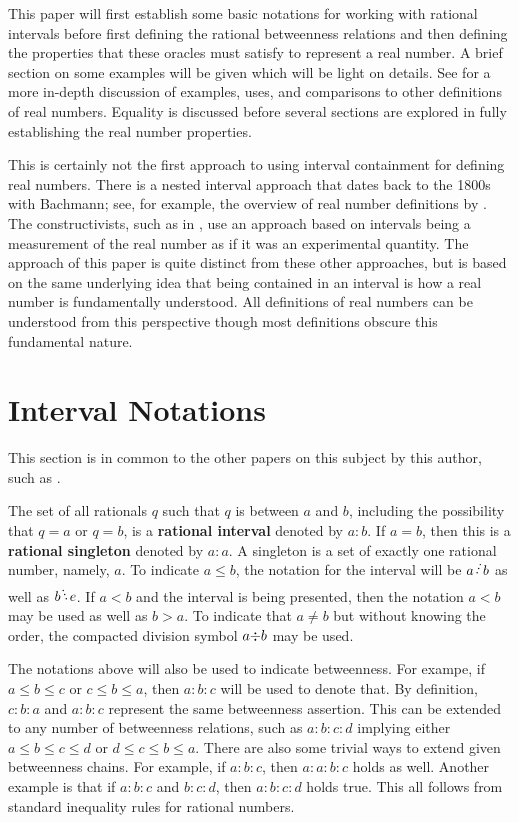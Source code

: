 \documentclass[12pt]{article}
\begin{document}
This paper will first establish some basic notations for working with rational intervals before first defining the rational betweenness relations and then defining the properties that these oracles must satisfy to represent a real number. A brief section on some examples will be given which will be light on details. See \cite{taylor23main} for a more in-depth discussion of examples, uses, and comparisons to other definitions of real numbers. Equality is discussed before several sections are explored in fully establishing the real number properties. 

This is certainly not the first approach to using interval containment for defining real numbers. There is a nested interval approach that dates back to the 1800s with Bachmann; see, for example, the overview of real number definitions by \cite{ittay-2015}. The constructivists, such as in \cite{bridger}, use an approach based on intervals being a measurement of the real number as if it was an experimental quantity. The approach of this paper is quite distinct from these other approaches, but is based on the same underlying idea that being contained in an interval is how a real number is fundamentally understood. All definitions of real numbers can be understood from this perspective though most definitions obscure this fundamental nature. 

\section{Interval Notations}

This section is in common to the other papers on this subject by this author, such as \cite{taylor24dedekind}.

The set of all rationals $q$ such that $q$ is between $a$ and $b$, including the possibility that $q=a$ or $q=b$, is a \textbf{rational interval} denoted by $a:b$. If $a=b$, then this is a \textbf{rational singleton} denoted by $a:a$. A singleton is a set of exactly one rational number, namely, $a$. To indicate $a \leq b$, the notation for the interval will be $a \lte b$ as well as $b \gte e$. If $a < b$ and the interval is being presented, then the notation $a \lt b$ may be used as well as $b \gt a$. To indicate that $a \neq b$ but without knowing the order, the compacted division symbol $a \mathord{\div} b$ may be used. 

The notations above will also be used to indicate betweenness. For exampe, if $a \leq b \leq c$ or $c \leq b \leq a$, then $a:b:c$ will be used to denote that. By definition, $c:b:a$ and $a:b:c$ represent the same betweenness assertion. This can be extended to any number of betweenness relations, such as $a:b:c:d$ implying either $a \leq b \leq c \leq d$ or $d \leq c \leq b \leq a$. There are also some trivial ways to extend given betweenness chains. For example, if $a:b:c$, then $a:a:b:c$ holds as well. Another example is that if $a:b:c$ and $b:c:d$, then $a:b:c:d$ holds true. This all follows from standard inequality rules for rational numbers. 
\end{document}

